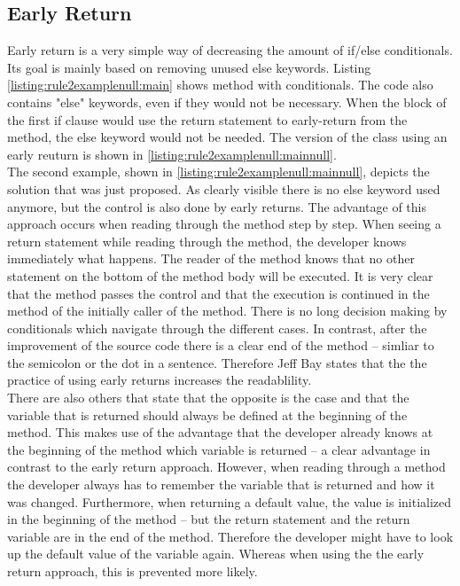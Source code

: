 \subsection*{Early Return}
Early return is a very simple way of decreasing the amount of if/else conditionals. Its goal is mainly based on removing unused else keywords. Listing \ref{listing:rule2examplenull:main} shows method with conditionals. The code also contains "else" keywords, even if they would not be necessary. When the block of the first if clause would use the return statement to early-return from the method, the else keyword would not be needed. The version of the class using an early reuturn is shown in \ref{listing:rule2examplenull:mainnull}.
\\

The second example, shown in \ref{listing:rule2examplenull:mainnull}, depicts the solution that was just proposed. As clearly visible there is no else keyword used anymore, but the control is also done by early returns. The advantage of this approach occurs when reading through the method step by step. When seeing a return statement while reading through the method, the developer knows immediately what happens. The reader of the method knows that no other statement on the bottom of the method body will be executed. It is very clear that the method passes the control and that the execution is continued in the method of the initially caller of the method. There is no long decision making by conditionals which navigate through the different cases. In contrast, after the improvement of the source code there is a clear end of the method -- simliar to the semicolon or the dot in a sentence. Therefore Jeff Bay states that the the practice of using early returns increases the  readablility. 
\\

There are also others that state that the opposite is the case and that the variable that is returned should always be defined at the beginning of the method. This makes use of the advantage that the developer already knows at the beginning of the method which variable is returned -- a clear advantage in contrast to the early return approach. However, when reading through a method the developer always has to remember the variable that is returned and how it was changed. Furthermore, when returning a default value, the value is initialized in the beginning of the method -- but the return statement and the return variable are in the end of the method. Therefore the developer might have to look up the default value of the variable again. Whereas when using the the early return approach, this is prevented more likely.


